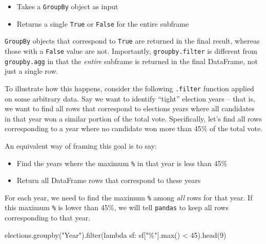 \documentclass[
  letterpaper,
  DIV=11,
  numbers=noendperiod]{scrreprt}
\newenvironment{Shaded}{\begin{snugshade}}{\end{snugshade}}
\newcommand{\BuiltInTok}[1]{\textcolor[rgb]{0.00,0.23,0.31}{#1}}
\newcommand{\DecValTok}[1]{\textcolor[rgb]{0.68,0.00,0.00}{#1}}
\newcommand{\KeywordTok}[1]{\textcolor[rgb]{0.00,0.23,0.31}{#1}}
\newcommand{\NormalTok}[1]{\textcolor[rgb]{0.00,0.23,0.31}{#1}}
\newcommand{\OperatorTok}[1]{\textcolor[rgb]{0.37,0.37,0.37}{#1}}
\newcommand{\StringTok}[1]{\textcolor[rgb]{0.13,0.47,0.30}{#1}}
\providecommand{\tightlist}{%
  \setlength{\itemsep}{0pt}\setlength{\parskip}{0pt}}\usepackage{longtable,booktabs,array}
\begin{document}
\begin{itemize}
\tightlist
\item
  Takes a \texttt{GroupBy} object as input
\item
  Returns a single \texttt{True} or \texttt{False} for the entire
  subframe
\end{itemize}

\texttt{GroupBy} objects that correspond to \texttt{True} are returned
in the final result, whereas those with a \texttt{False} value are not.
Importantly, \texttt{groupby.filter} is different from
\texttt{groupby.agg} in that the \emph{entire} subframe is returned in
the final DataFrame, not just a single row.

To illustrate how this happens, consider the following \texttt{.filter}
function applied on some arbitrary data. Say we want to identify
``tight'' election years -- that is, we want to find all rows that
correspond to elections years where all candidates in that year won a
similar portion of the total vote. Specifically, let's find all rows
corresponding to a year where no candidate won more than 45\% of the
total vote.

An equivalent way of framing this goal is to say:

\begin{itemize}
\tightlist
\item
  Find the years where the maximum \texttt{\%} in that year is less than
  45\%
\item
  Return all DataFrame rows that correspond to these years
\end{itemize}

For each year, we need to find the maximum \texttt{\%} among \emph{all}
rows for that year. If this maximum \texttt{\%} is lower than 45\%, we
will tell \texttt{pandas} to keep all rows corresponding to that year.

\begin{Shaded}
\begin{Highlighting}[]
\NormalTok{elections.groupby(}\StringTok{"Year"}\NormalTok{).}\BuiltInTok{filter}\NormalTok{(}\KeywordTok{lambda}\NormalTok{ sf: sf[}\StringTok{"\%"}\NormalTok{].}\BuiltInTok{max}\NormalTok{() }\OperatorTok{\textless{}} \DecValTok{45}\NormalTok{).head(}\DecValTok{9}\NormalTok{)}
\end{Highlighting}
\end{Shaded}
\end{document}
